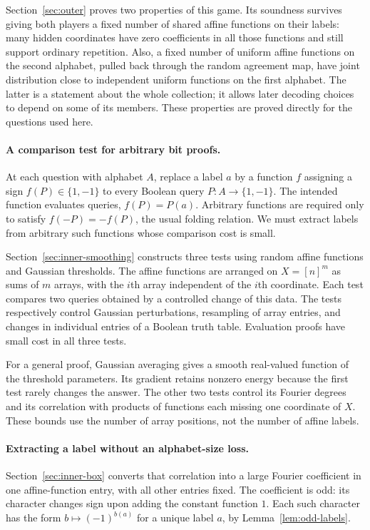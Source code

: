 Section~\ref{sec:outer} proves two properties of this game. Its soundness
survives giving both players a fixed number of shared affine functions on
their labels: many hidden coordinates have zero coefficients in all those
functions and still support ordinary repetition. Also, a fixed number of
uniform affine functions on the second alphabet, pulled back through the
random agreement map, have joint distribution close to independent uniform
functions on the first alphabet. The latter is a statement about the whole
collection; it allows later decoding choices to depend on some of its
members. These properties are proved directly for the questions used here.

\paragraph{A comparison test for arbitrary bit proofs.}
At each question with alphabet $A$, replace a label $a$ by a function
$f$ assigning a sign $f(P)\in\{1,-1\}$ to every Boolean query
$P:A\to\{1,-1\}$. The intended function evaluates
queries, $f(P)=P(a)$. Arbitrary functions are required only to satisfy
$f(-P)=-f(P)$, the usual folding relation. We must extract labels from
arbitrary such functions whose comparison cost is small.

Section~\ref{sec:inner-smoothing} constructs three tests using random affine
functions and Gaussian thresholds. The affine functions are arranged on
$X=[n]^m$ as sums of $m$ arrays, with the $i$th array independent of the
$i$th coordinate. Each test compares two queries obtained by a controlled
change of this data. The tests respectively control Gaussian perturbations,
resampling of array entries, and changes in individual entries of a Boolean
truth table. Evaluation proofs have small cost in all three tests.

For a general proof, Gaussian averaging gives a smooth real-valued function
of the threshold parameters. Its gradient retains nonzero energy because
the first test rarely changes the answer. The other two tests control its
Fourier degrees and its correlation with products of functions each missing
one coordinate of $X$. These bounds use the number of array positions,
not the number of affine labels.

\paragraph{Extracting a label without an alphabet-size loss.}
Section~\ref{sec:inner-box} converts that correlation into a large Fourier
coefficient in one affine-function entry, with all other entries fixed.
The coefficient is odd: its character changes sign upon adding the constant
function $1$. Each such character has the form $b\mapsto(-1)^{b(a)}$ for a unique
label $a$, by Lemma~\ref{lem:odd-labels}.

